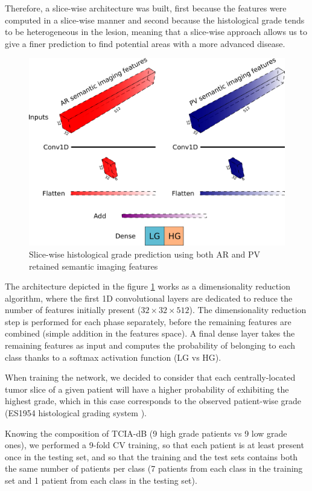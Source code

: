 \documentclass[]{article}
\newcommand{\lmttfont}[1]{{\fontfamily{lmtt}\selectfont #1}}
\begin{document}
Therefore, a slice-wise architecture was built, first because the
features were computed in a slice-wise manner and second because the
histological grade tends to be heterogeneous in the lesion, meaning that
a slice-wise approach allows us to give a finer prediction to find
potential areas with a more advanced disease.


\begin{figure}[th!]
\centering
\includegraphics[width=0.9\linewidth]{images/gradpredictionArchitecture}
\caption{Slice-wise histological grade prediction using both AR and PV retained semantic imaging features}
\label{fig:gradpredictionArchitecture}
\end{figure}



The architecture depicted in the figure \ref{fig:gradpredictionArchitecture} works as a dimensionality
reduction algorithm, where the first 1D convolutional layers are dedicated to
reduce the number of features initially present ($ 32\times32\times512 $). The
dimensionality reduction step is performed for each phase separately,
before the remaining features are combined (simple addition in the
features space).
A final dense layer takes the remaining features as input and computes
the probability of belonging to each class thanks to a softmax activation
function (LG vs HG).

When training the network, we decided to consider that each
centrally-located tumor slice of a given patient will have a higher
probability of exhibiting the highest grade, which in this case
corresponds to the observed patient-wise grade (ES1954 histological grading system \cite{EdmondsonHA1954}).

Knowing the composition of \lmttfont{TCIA-dB} (9 high grade patients vs 9 low
grade ones), we performed a 9-fold CV training, so that each patient is
at least present once in the testing set, and so that the training and
the test sets contains both the same number of patients per
class (7 patients from each class in the training set and 1 patient from
each class in the testing set).
\end{document}
